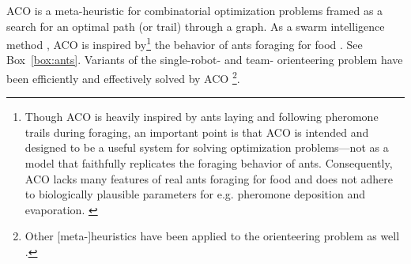 \documentclass[11pt, oneside]{article}
\begin{document}
ACO \cite{dorigo2006ant,bonabeau1999swarm,blum2005ant} is a meta-heuristic for combinatorial optimization problems framed as a search for an optimal path (or trail) through a graph.
As a swarm intelligence method \cite{bonabeau1999swarm}, ACO is inspired by\footnote{
Though ACO is heavily inspired by ants laying and following pheromone trails during foraging, an important point is that ACO is intended and designed to be a useful system for solving optimization problems---not as a model that faithfully replicates the foraging behavior of ants. 
Consequently, ACO lacks many features of real ants foraging for food and does not adhere to biologically plausible parameters for e.g. pheromone deposition and evaporation. \cite{bonabeau1999swarm}
}
 the behavior of ants foraging for food \cite{bonabeau2000inspiration}. See Box~\ref{box:ants}. 
Variants of the single-robot- and team- orienteering problem have been efficiently and effectively solved by ACO \cite{ke2008ants,chen2015multiobjective,verbeeck2017time,sohrabi2021acs,chen2022environment}\footnote{Other [meta-]heuristics have been applied to the orienteering problem as well \cite{gavalas2014survey,dang2013effective,chao1996fast,butt1994heuristic}.}.
\end{document}
